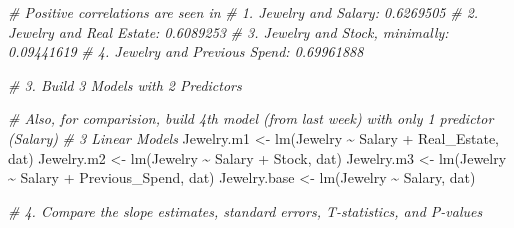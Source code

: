 \documentclass[
]{article}
\newenvironment{Shaded}{\begin{snugshade}}{\end{snugshade}}
\newcommand{\CommentTok}[1]{\textcolor[rgb]{0.56,0.35,0.01}{\textit{#1}}}
\newcommand{\FunctionTok}[1]{\textcolor[rgb]{0.00,0.00,0.00}{#1}}
\newcommand{\NormalTok}[1]{#1}
\newcommand{\OtherTok}[1]{\textcolor[rgb]{0.56,0.35,0.01}{#1}}
\newcommand{\SpecialCharTok}[1]{\textcolor[rgb]{0.00,0.00,0.00}{#1}}
\begin{document}
\begin{Shaded}
\begin{Highlighting}[]
\CommentTok{\# Positive correlations are seen in }
\CommentTok{\# 1. Jewelry and Salary: 0.6269505}
\CommentTok{\# 2. Jewelry and Real Estate: 0.6089253}
\CommentTok{\# 3. Jewelry and Stock, minimally: 0.09441619}
\CommentTok{\# 4. Jewelry and Previous Spend: 0.69961888}



\CommentTok{\# 3. Build 3 Models with 2 Predictors}
\end{Highlighting}
\end{Shaded}

\begin{Shaded}
\begin{Highlighting}[]
\CommentTok{\# Also, for comparision, build 4th model (from last week) with only 1 predictor (Salary)}
\CommentTok{\# 3 Linear Models}
\NormalTok{Jewelry.m1 }\OtherTok{\textless{}{-}} \FunctionTok{lm}\NormalTok{(Jewelry }\SpecialCharTok{\textasciitilde{}}\NormalTok{ Salary }\SpecialCharTok{+}\NormalTok{ Real\_Estate, dat)}
\NormalTok{Jewelry.m2 }\OtherTok{\textless{}{-}} \FunctionTok{lm}\NormalTok{(Jewelry }\SpecialCharTok{\textasciitilde{}}\NormalTok{ Salary }\SpecialCharTok{+}\NormalTok{ Stock, dat)}
\NormalTok{Jewelry.m3 }\OtherTok{\textless{}{-}} \FunctionTok{lm}\NormalTok{(Jewelry }\SpecialCharTok{\textasciitilde{}}\NormalTok{ Salary }\SpecialCharTok{+}\NormalTok{ Previous\_Spend, dat)}
\NormalTok{Jewelry.base }\OtherTok{\textless{}{-}} \FunctionTok{lm}\NormalTok{(Jewelry }\SpecialCharTok{\textasciitilde{}}\NormalTok{ Salary, dat)}

\CommentTok{\# 4. Compare the slope estimates, standard errors, T{-}statistics, and P{-}values}
\end{Highlighting}
\end{Shaded}
\end{document}
